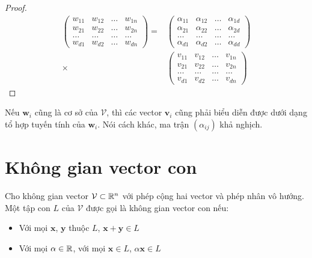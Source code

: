 \begin{proof}
    \begin{align*}
        \begin{pmatrix}
            w_{11} & w_{12} & \ldots & w_{1n} \\
            w_{21} & w_{22} & \ldots & w_{2n} \\
            \ldots & \ldots & \ldots & \ldots \\
            w_{d1} & w_{d2} & \ldots & w_{dn}
        \end{pmatrix}
        = & \begin{pmatrix}
            \alpha_{11} & \alpha_{12} & \ldots & \alpha_{1d} \\
            \alpha_{21} & \alpha_{22} & \ldots & \alpha_{2d} \\
            \ldots & \ldots & \ldots & \ldots \\
            \alpha_{d1} & \alpha_{d2} & \ldots & \alpha_{dd}
        \end{pmatrix} \\
        \times & \begin{pmatrix}
            v_{11} & v_{12} & \ldots & v_{1n} \\ 
            v_{21} & v_{22} & \ldots & v_{2n} \\ 
            \ldots & \ldots & \ldots & \ldots \\ 
            v_{d1} & v_{d2} & \ldots & v_{dn}
        \end{pmatrix}
    \end{align*}
\end{proof}

Nếu $\bm{w}_i$ cũng là cơ sở của $\mathcal{V}$, thì các vector $\bm{v}_i$ cũng phải
biểu diễn được dưới dạng tổ hợp tuyến tính của $\bm{w}_i$.
Nói cách khác, ma trận $(\alpha_{ij})$ khả nghịch.

\section{Không gian vector con}

Cho không gian vector $\mathcal{V} \subset \mathbb{R}^n$ với phép cộng hai vector
và phép nhân vô hướng. Một tập con $L$ của $\mathcal{V}$ được gọi
là không gian vector con nếu:

\begin{itemize}
    \item Với mọi $\bm{x}$, $\bm{y}$ thuộc $L$, $\bm{x} + \bm{y} \in L$
    \item Với mọi $\alpha \in \mathbb{R}$, với mọi $\bm{x} \in L$, $\alpha \bm{x} \in L$
\end{itemize}

